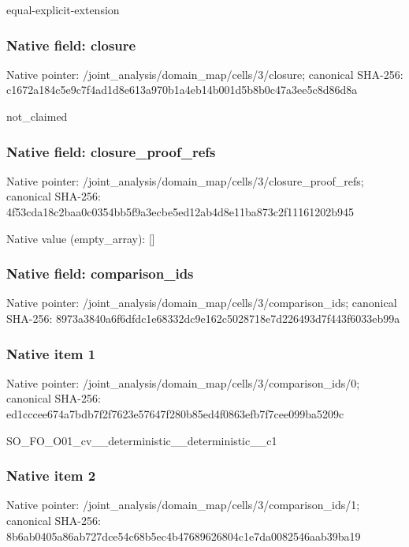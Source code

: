 \documentclass[10pt,a4paper]{article}
\begin{document}
\begingroup\raggedright\sloppy equal-explicit-extension\par\endgroup

\subsubsection{Native field: closure}
Native pointer: /joint\_\allowbreak{}analysis/domain\_\allowbreak{}map/cells/3/closure; canonical SHA-256: c1672a184c5e9c7f4ad1d8e613a970b1a4eb14b001d5b8b0c47a3ee5c8d86d8a

\begingroup\raggedright\sloppy not\_\allowbreak{}claimed\par\endgroup

\subsubsection{Native field: closure\_\allowbreak{}proof\_\allowbreak{}refs}
Native pointer: /joint\_\allowbreak{}analysis/domain\_\allowbreak{}map/cells/3/closure\_\allowbreak{}proof\_\allowbreak{}refs; canonical SHA-256: 4f53cda18c2baa0c0354bb5f9a3ecbe5ed12ab4d8e11ba873c2f11161202b945

Native value (empty\_\allowbreak{}array): []

\subsubsection{Native field: comparison\_\allowbreak{}ids}
Native pointer: /joint\_\allowbreak{}analysis/domain\_\allowbreak{}map/cells/3/comparison\_\allowbreak{}ids; canonical SHA-256: 8973a3840a6f6dfdc1e68332dc9e162c5028718e7d226493d7f443f6033eb99a

\subsubsection{Native item 1}
Native pointer: /joint\_\allowbreak{}analysis/domain\_\allowbreak{}map/cells/3/comparison\_\allowbreak{}ids/0; canonical SHA-256: ed1cccee674a7bdb7f2f7623e57647f280b85ed4f0863efb7f7cee099ba5209c

\begingroup\raggedright\sloppy SO\_\allowbreak{}FO\_\allowbreak{}O01\_\allowbreak{}cv\_\allowbreak{}\_\allowbreak{}deterministic\_\allowbreak{}\_\allowbreak{}deterministic\_\allowbreak{}\_\allowbreak{}c1\par\endgroup

\subsubsection{Native item 2}
Native pointer: /joint\_\allowbreak{}analysis/domain\_\allowbreak{}map/cells/3/comparison\_\allowbreak{}ids/1; canonical SHA-256: 8b6ab0405a86ab727dce54c68b5ec4b47689626804c1e7da0082546aab39ba19
\end{document}
